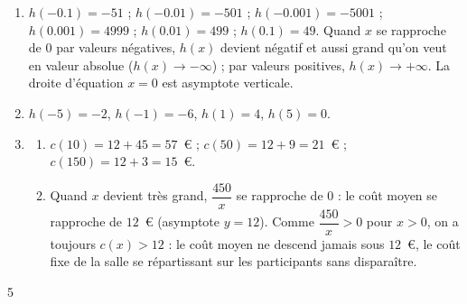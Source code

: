 {\begin{enumerate}
\item $h(-\num{0,1})=-51$ ; $h(-\num{0,01})=-501$ ; $h(-\num{0,001})=-\num{5001}$ ; $h(\num{0,001})=\num{4999}$ ; $h(\num{0,01})=499$ ; $h(\num{0,1})=49$. Quand $x$ se rapproche de $0$ par valeurs négatives, $h(x)$ devient négatif et aussi grand qu'on veut en valeur absolue ($h(x)\to-\infty$) ; par valeurs positives, $h(x)\to+\infty$. La droite d'équation $x=0$ est asymptote verticale.
\item $h(-5)=-2$, $h(-1)=-6$, $h(1)=4$, $h(5)=0$.
\begin{center}
\end{center}
\item
\begin{enumerate}[label=\alph*.]
\item $c(10)=12+45=57$~€ ; $c(50)=12+9=21$~€ ; $c(150)=12+3=15$~€.
\item Quand $x$ devient très grand, $\dfrac{450}{x}$ se rapproche de $0$ : le coût moyen se rapproche de $12$~€ (asymptote $y=12$). Comme $\dfrac{450}{x}>0$ pour $x>0$, on a toujours $c(x)>12$ : le coût moyen ne descend jamais sous $12$~€, le coût fixe de la salle se répartissant sur les participants sans disparaître.
\end{enumerate}
\end{enumerate}
}{5}

